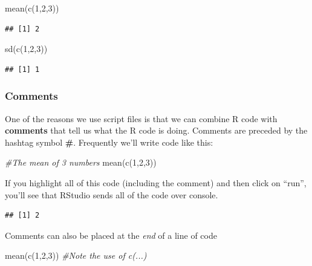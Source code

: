 \documentclass[
]{book}
\newenvironment{Shaded}{\begin{snugshade}}{\end{snugshade}}
\newcommand{\CommentTok}[1]{\textcolor[rgb]{0.56,0.35,0.01}{\textit{#1}}}
\newcommand{\DecValTok}[1]{\textcolor[rgb]{0.00,0.00,0.81}{#1}}
\newcommand{\FunctionTok}[1]{\textcolor[rgb]{0.00,0.00,0.00}{#1}}
\newcommand{\NormalTok}[1]{#1}
\begin{document}
\begin{Shaded}
\begin{Highlighting}[]
\FunctionTok{mean}\NormalTok{(}\FunctionTok{c}\NormalTok{(}\DecValTok{1}\NormalTok{,}\DecValTok{2}\NormalTok{,}\DecValTok{3}\NormalTok{))}
\end{Highlighting}
\end{Shaded}

\begin{verbatim}
## [1] 2
\end{verbatim}

\begin{Shaded}
\begin{Highlighting}[]
\FunctionTok{sd}\NormalTok{(}\FunctionTok{c}\NormalTok{(}\DecValTok{1}\NormalTok{,}\DecValTok{2}\NormalTok{,}\DecValTok{3}\NormalTok{))}
\end{Highlighting}
\end{Shaded}

\begin{verbatim}
## [1] 1
\end{verbatim}

\hypertarget{comments}{%
\subsubsection{Comments}\label{comments}}

One of the reasons we use script files is that we can combine R code with \textbf{comments} that tell us what the R code is doing. Comments are preceded by the hashtag symbol \textbf{\#}. Frequently we'll write code like this:

\begin{Shaded}
\begin{Highlighting}[]
\CommentTok{\#The mean of 3 numbers}
\FunctionTok{mean}\NormalTok{(}\FunctionTok{c}\NormalTok{(}\DecValTok{1}\NormalTok{,}\DecValTok{2}\NormalTok{,}\DecValTok{3}\NormalTok{))}
\end{Highlighting}
\end{Shaded}

If you highlight all of this code (including the comment) and then click on ``run'', you'll see that RStudio sends all of the code over console.

\begin{verbatim}
## [1] 2
\end{verbatim}

Comments can also be placed at the \emph{end} of a line of code

\begin{Shaded}
\begin{Highlighting}[]
\FunctionTok{mean}\NormalTok{(}\FunctionTok{c}\NormalTok{(}\DecValTok{1}\NormalTok{,}\DecValTok{2}\NormalTok{,}\DecValTok{3}\NormalTok{)) }\CommentTok{\#Note  the use of c(...)}
\end{Highlighting}
\end{Shaded}
\end{document}
